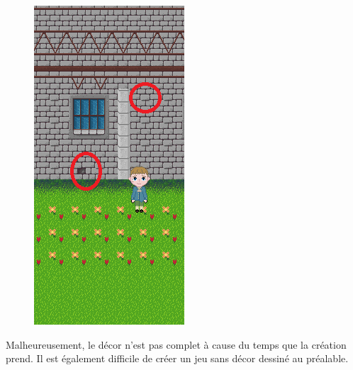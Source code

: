 \documentclass[11pt]{article}
\begin{document}
\begin{figure}[H]
\includegraphics{chateau}
\centering
\end{figure}

Malheureusement, le décor n'est pas complet à cause du temps que la création prend. Il est également difficile de créer un jeu sans décor dessiné au préalable.\\



\end{document}
